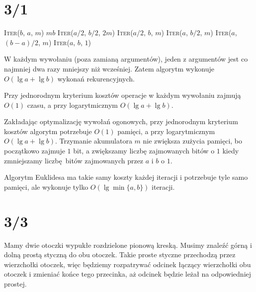 \documentclass[a4paper, 12pt]{article}
\title{}
\author{Wiktor Kuchta}
\date{\vspace{-4ex}}
\newcommand{\+}{\enspace}
\begin{document}
\maketitle
\section*{3/1}
\begin{algorithm}
	\begin{algorithmic}
				\State \Return \textsc{Iter}($b$, $a$, $m$)
				\State \Return $mb$
				\State \Return \textsc{Iter}($a/2$, $b/2$, $2m$)
				\State \Return \textsc{Iter}($a/2$, $b$, $m$)
				\State \Return \textsc{Iter}($a$, $b/2$, $m$)
				\State \Return \textsc{Iter}($a$, $(b-a)/2$, $m$)
			\EndIf
			\EndProcedure
			\State \Return \textsc{Iter}($a$, $b$, $1$)
		\EndProcedure
	\end{algorithmic}
\end{algorithm}
W każdym wywołaniu (poza zamianą argumentów), jeden z argumentów
jest co najmniej dwa razy mniejszy niż wcześniej.
Zatem algorytm wykonuje $O(\lg a + \lg b)$ wykonań rekurencyjnych.

Przy jednorodnym kryterium kosztów operacje w każdym wywołaniu zajmują
$O(1)$ czasu, a przy logarytmicznym $O(\lg a + \lg b)$.

Zakładając optymalizację wywołań ogonowych,
przy jednorodnym kryterium kosztów algorytm potrzebuje $O(1)$ pamięci,
a przy logarytmicznym $O(\lg a + \lg b)$.
Trzymanie akumulatora $m$ nie zwiększa zużycia pamięci, bo początkowo
zajmuje $1$ bit, a zwiększamy liczbę zajmowanych bitów o $1$ kiedy zmniejszamy
liczbę bitów zajmowanych przez $a$ i $b$ o $1$.

Algorytm Euklidesa ma takie samy koszty każdej iteracji i potrzebuje tyle samo pamięci,
ale wykonuje tylko $O(\lg\min\{a, b\})$ iteracji.

\section*{3/3}
Mamy dwie otoczki wypukłe rozdzielone pionową kreską.
Musimy znaleźć górną i dolną prostą styczną do obu otoczek.
Takie proste styczne przechodzą przez wierzchołki otoczek, więc
będziemy rozpatrywać odcinek łączący wierzchołki obu otoczek i
zmieniać końce tego przecinka, aż odcinek będzie leżał na odpowiedniej prostej.
\end{document}

